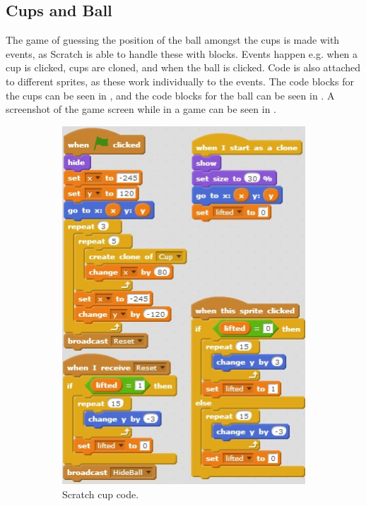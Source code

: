 \subsection{Cups and Ball}
The game of guessing the position of the ball amongst the cups is made with events, as Scratch is able to handle these with blocks. Events happen e.g. when a cup is clicked, cups are cloned, and when the ball is clicked. Code is also attached to different sprites, as these work individually to the events. The code blocks for the cups can be seen in , and the code blocks for the ball can be seen in . A screenshot of the game screen while in a game can be seen in .

\begin{figure}[h]
  \centering
    \begin{subfigure}[b]{0.45\textwidth}
    \begin{center}
      \includegraphics[scale=0.7]{./pics/scratch_ball_code1}
      \caption{Scratch cup code.}
      \label{fig:scratch_ball_code1}
    \end{center}
    \end{subfigure}
    ~
    \begin{subfigure}[b]{0.45\textwidth}
    \begin{center}

\end{center}
\end{subfigure}
\end{figure}
